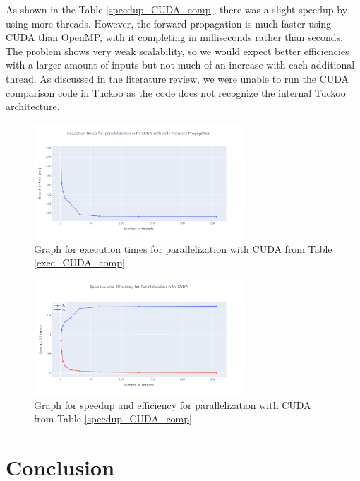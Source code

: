 \documentclass[11pt]{article}
\begin{document}
As shown in the Table \ref{speedup_CUDA_comp}, there was a slight speedup by using more threads. However, the forward propagation is much faster using CUDA than OpenMP, with it completing in milliseconds rather than seconds. The problem shows very weak scalability, so we would expect better efficiencies with a larger amount of inputs but not much of an increase with each additional thread. As discussed in the literature review, we were unable to run the CUDA comparison code in Tuckoo as the code does not recognize the internal Tuckoo architecture.


\begin{figure}[H]
    \centering
    \includegraphics[width=0.7\textwidth]{Plots/exec_CUDA_comp.png}
    \caption{Graph for execution times for parallelization with CUDA from Table \ref{exec_CUDA_comp}}
    \label{fig:execCUDAcomp}
\end{figure}


\begin{figure}[H]
    \centering
    \includegraphics[width=0.7\textwidth]{Plots/speedup_CUDA_comp.png}
    \caption{Graph for speedup and efficiency for parallelization with CUDA from Table \ref{speedup_CUDA_comp}}
    \label{fig:speedupCUDAcomp}
\end{figure}


\clearpage

\section{Conclusion}
\end{document}
